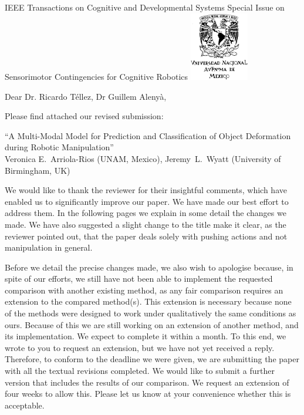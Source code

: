 \documentclass[a4paper,12pt]{letter}
\begin{document}

\begin{letter}{IEEE Transactions on Cognitive and Developmental Systems\newline
Special Issue on Sensorimotor Contingencies for Cognitive Robotics}
\includegraphics[height=3cm, keepaspectratio=true]{figures/unam.jpg}\vspace*{-3cm}
\address{Facultad de Ciencias, \\Ciudad Universitaria,\\ UNAM, México, D.F.}

\opening{Dear Dr. Ricardo Téllez, Dr Guillem Aleny\`{a},}

Please find attached our revised submission:
\begin{center}
 ``A Multi-Modal Model for Prediction and Classification of Object Deformation during Robotic Manipulation'' \\
 Veronica E.~Arriola-Rios (UNAM, Mexico), Jeremy~L.~Wyatt (University of Birmingham, UK)
\end{center}

We would like to thank the reviewer for their insightful comments, which have enabled us to significantly improve our paper. We have made our best effort to address them.  In the following pages we explain in some detail the changes we made. We have also suggested a slight change to the title make it clear, as the reviewer pointed out, that the paper deals solely with pushing actions and not manipulation in general. 

Before we detail the precise changes made, we also wish to apologise because, in spite of our efforts, we still have not been able to implement the requested comparison with another existing method, as any fair comparison requires an extension to the compared method(s). This extension is necessary because none of the methods were designed to work under qualitatively the same conditions as ours.  Because of this we are still working on an extension of another method, and its implementation. We expect to complete it within a month. To this end, we wrote to you to request an extension, but we have not yet received a reply. Therefore, to conform to the deadline we were given, we are submitting the paper with all the textual revisions completed. We would like to submit a further version that includes the results of our comparison. We request an extension of four weeks to allow this. Please let us know at your convenience whether this is acceptable.


\end{letter}
\end{document}

